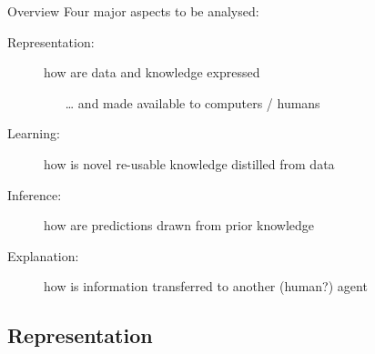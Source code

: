 \documentclass[presentation]{beamer}\mode<presentation>{\usetheme{AMSBolognaFC}}
\begin{document}
\begin{frame}{Overview}
    Four major aspects to be analysed:
    \vfill
    \begin{description}
        \item[Representation:] how are data and knowledge \alert{expressed}
        \begin{itemize}
            \item[\ldots] and made available to computers / humans
        \end{itemize}
        
        \vfill

        \item[Learning:] how is novel re-usable knowledge \alert{distilled} from data
        
        \vfill

        \item[Inference:] how are predictions \alert{drawn} from prior knowledge
        
        \vfill

        \item[Explanation:] how is information \alert{transferred} to another (human?) agent

    \end{description}
\end{frame}

\subsection{Representation}
\end{document}

